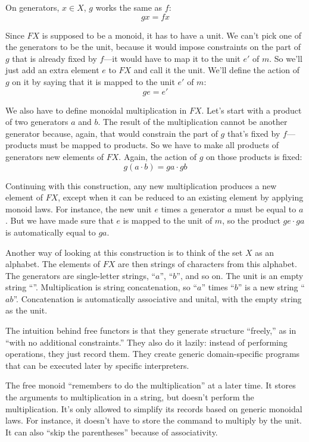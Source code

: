 \documentclass[DaoFP]{subfiles}
\begin{document}
On generators, $x \in X$, $g$ works the same as $f$:
\[ g x = f x \]

Since $F X$ is supposed to be a monoid, it has to have a unit. We can't pick one of the generators to be the unit, because it would impose constraints on the part of $g$ that is already fixed by $f$---it would have to map it to the unit $e'$ of $m$. So we'll just add an extra element $e$ to $F X$ and call it the unit. We'll define the action of $g$ on it by saying that it is mapped to the unit $e'$ of $m$:
\[ g e = e' \]

We also have to define monoidal multiplication in $F X$. Let's start with a product of two generators $a$ and $b$. The result of the multiplication cannot be another generator because, again, that would constrain the part of $g$ that's fixed by $f$---products must be mapped to products. So we have to make all products of generators new elements of $F X$. Again, the action of $g$ on those products is fixed:
\[ g (a \cdot b)  = g a \cdot g b\]

Continuing with this construction, any new multiplication produces a new element of $F X$, except when it can be reduced to an existing element by applying monoid laws. For instance, the new unit $e$ times a generator $a$ must be equal to $a$. But we have made sure that $e$ is mapped to the unit of $m$, so the product $g e \cdot g a$ is automatically equal to $g a$.

Another way of looking at this construction is to think of the set $X$ as an alphabet. The elements of $F X$ are then strings of characters from this alphabet. The generators are single-letter strings, ``$a$'', ``$b$'', and so on. The unit is an empty string ``''. Multiplication is string concatenation, so  ``$a$'' times ``$b$'' is a new string ``$ab$''. Concatenation is automatically associative and unital, with the empty string as the unit.

The intuition behind free functors is that they generate structure ``freely,'' as in ``with no additional constraints.'' They also do it lazily: instead of performing operations, they just record them. They create generic domain-specific programs that can be executed later by specific interpreters.

The free monoid ``remembers to do the multiplication'' at a later time. It stores the arguments to multiplication in a string, but doesn't perform the multiplication. It's only allowed to simplify its records based on generic monoidal laws. For instance, it doesn't have to store the command to multiply by the unit. It can also ``skip the parentheses'' because of associativity. 
\end{document}

